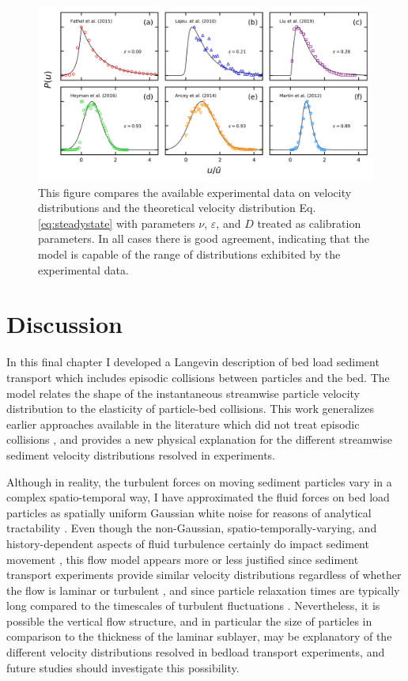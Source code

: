 \begin{figure}
	\centerline{\includegraphics{./figures/ch5/Fig4expComparison.png}}
	\caption{This figure compares the available experimental data on velocity distributions and the theoretical velocity distribution Eq. \ref{eq:steadystate} with parameters $\nu$, $\varepsilon$, and $D$ treated as calibration parameters. In all cases there is good agreement, indicating that the model is capable of the range of distributions exhibited by the experimental data.} \label{fig:fig4ch5}
\end{figure}


\section{Discussion}
\label{sec:langdiscussion}

In this final chapter I developed a Langevin description of bed load sediment transport which includes episodic collisions between particles and the bed.
The model relates the shape of the instantaneous streamwise particle velocity distribution to the elasticity of particle-bed collisions.
This work generalizes earlier approaches available in the literature which did not treat episodic collisions \citep{Ancey2014,Fan2014}, and provides a new physical explanation for the different streamwise sediment velocity distributions resolved in experiments.

Although in reality, the turbulent forces on moving sediment particles vary in a complex spatio-temporal way, I have approximated the fluid forces on bed load particles as spatially uniform Gaussian white noise for reasons of analytical tractability \cite[e.g.][]{Michaelides1997}. Even though the non-Gaussian, spatio-temporally-varying, and history-dependent aspects of fluid turbulence certainly do impact sediment movement \citep{Cameron2020,Celik2014}, this flow model appears more or less justified since sediment transport experiments provide similar velocity distributions regardless of whether the flow is laminar or turbulent \citep{Lajeunesse2010, Charru2004}, and since particle relaxation times are typically long compared to the timescales of turbulent fluctuations \citep{Hofland2006,Schmeeckle2007,Nakagawa1981}.
Nevertheless, it is possible the vertical flow structure, and in particular the size of particles in comparison to the thickness of the laminar sublayer, may be explanatory of the different velocity distributions resolved in bedload transport experiments, and future studies should investigate this possibility.

